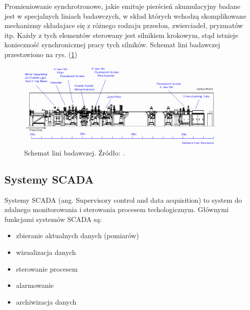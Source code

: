 	
	\hspace{2em} Promieniowanie synchrotronowe, jakie emituje pierścień akumulacyjny badane jest w specjalnych liniach badawczych, w skład których wchodzą skomplikowane mechanizmy składajace się z różnego rodzaju przesłon, zwierciadeł, pryzmatów itp. Każdy z tych elementów sterowany jest silnikiem krokowym, stąd istnieje konieczność synchronicznej pracy tych silników. Schemat lini badawczej przestawiono na rys. (\ref{fig:schematliniBadawczej})
	\newline
	\newline
	\newline
	
	\begin{figure}[ht]
		\centering
		\includegraphics[width=0.9\linewidth]{Grafika/liniaBadawcza}
		\caption{Schemat lini badawczej. Źródło: \cite{web:exp_line}.}
		\label{fig:schematliniBadawczej}
	\end{figure}
	
\subsection{Systemy SCADA}
	
	\hspace{2em}Systemy SCADA (ang. Supervisory control and data acquisition) to system do zdalnego monitorowania i sterowania procesem techologicznym. Głównymi funkcjami systemów SCADA są:
	
	\begin{itemize}
		\item zbieranie aktualnych danych (pomiarów)
		\item wizualizacja danych
		\item sterowanie procesem
		\item alarmowanie
		\item archiwizacja danych	
	\end{itemize}
	
